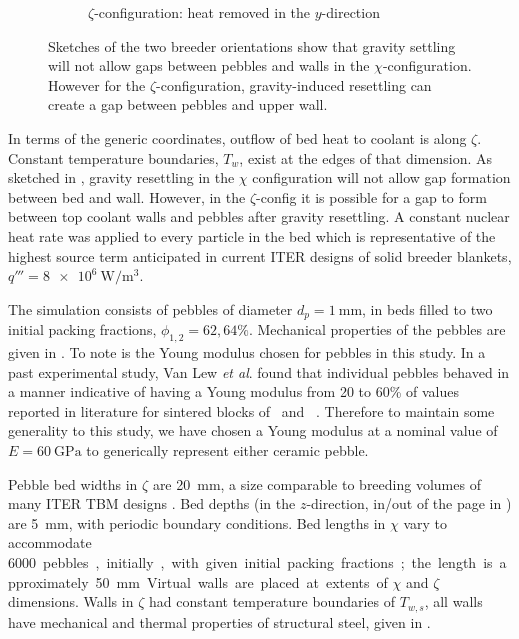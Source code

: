 \begin{figure}[!ht]
\begin{subfigure}[b]{0.44\textwidth}
        \caption{$\zeta$-configuration: heat removed in the $y$-direction}\label{fig:y-domain}
    \end{subfigure}
    \caption{Sketches of the two breeder orientations show that gravity settling will not allow gaps between pebbles and walls in the $\chi$-configuration. However for the $\zeta$-configuration, gravity-induced resettling can create a gap between pebbles and upper wall. }\label{fig:domains}
\end{figure}

In terms of the generic coordinates, outflow of bed heat to coolant is along $\zeta$. Constant temperature boundaries, $T_w$, exist at the edges of that dimension. As sketched in , gravity resettling in the $\chi$ configuration will not allow gap formation between bed and wall. However, in the $\zeta$-config it is possible for a gap to form between top coolant walls and pebbles after gravity resettling. A constant nuclear heat rate was applied to every particle in the bed which is representative of the highest source term anticipated in current ITER designs of solid breeder blankets, $q''' = \SI{8e6}{\watt\per\meter\cubed}$.

The simulation consists of pebbles of diameter $d_p = \SI{1}{\milli\meter}$, in beds filled to two initial packing fractions, $\phi_{1,2} = 62, 64\%$. Mechanical properties of the pebbles are given in . To note is the Young modulus chosen for pebbles in this study. In a past experimental study, Van Lew \textit{et al}. found that individual pebbles behaved in a manner indicative of having a Young modulus from 20 to 60\% of values reported in literature for sintered blocks of \lit~and \lis~\cite{VanLew2015}. Therefore to maintain some generality to this study, we have chosen a Young modulus at a nominal value of $E=\SI{60}{\giga\pascal}$ to generically represent either ceramic pebble.

Pebble bed widths in $\zeta$ are \SI{20}{\milli\meter}, a size comparable to breeding volumes of many ITER TBM designs \cite{Hernandez2013,Cho2008,Feng2012a}. Bed depths (in the $z$-direction, in/out of the page in ) are \SI{5}{\milli\meter}, with periodic boundary conditions. Bed lengths in $\chi$ vary to accommodate \SI{6000} pebbles, initially, with given initial packing fractions; the length is approximately \SI{50}{\milli\meter}. Virtual walls are placed at extents of $\chi$ and $\zeta$ dimensions. Walls in $\zeta$ had constant temperature boundaries of $T_{w,s}$, all walls have mechanical and thermal properties of structural steel, given in .


